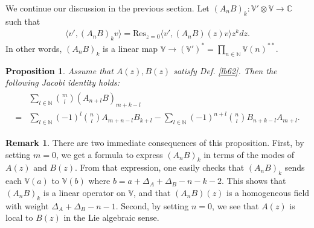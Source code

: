 \documentclass[11pt,b5paper,notitlepage]{article}
\theoremstyle{definition}
\newtheorem{rem}[df]{Remark}
\theoremstyle{plain}
\newtheorem{pp}[df]{Proposition}
\newcommand{\Res}{\mathrm{Res}}
\newcommand{\bk}[1]{\langle {#1}\rangle}
\newcommand{\Vbb}{\mathbb V}
\newcommand{\Cbb}{\mathbb C}
\newcommand{\Nbb}{\mathbb N}
\numberwithin{equation}{section}
\begin{document}
We continue our discussion in the previous section. Let $(A_nB)_k:\Vbb'\otimes\Vbb\rightarrow\Cbb$ such that
\begin{align*}
\bk{v',(A_nB)_kv}=\Res_{z=0}\bk{v',(A_nB)(z)v}z^kdz.	
\end{align*}
In other words, $(A_nB)_k$ is a linear map $\Vbb\rightarrow(\Vbb')^*=\prod_{n\in\Nbb}\Vbb(n)^{**}$.

\begin{pp}\label{lb71}
Assume that $A(z),B(z)$ satisfy Def. \ref{lb62}. Then the following Jacobi identity holds:
\begin{align}\label{eq107}
\begin{aligned}
&\sum_{l\in\Nbb}{m\choose l}(A_{n+l}B)_{m+k-l}\\
=&\sum_{l\in\Nbb}(-1)^l{n\choose l}A_{m+n-l}B_{k+l}-\sum_{l\in\Nbb}(-1)^{n+l}{n\choose l}B_{n+k-l} A_{m+l}.
\end{aligned}
\end{align}
\end{pp}

\begin{rem}
There are two immediate consequences of this proposition. First, by setting $m=0$, we get a formula to express $(A_nB)_k$ in terms of the modes of $A(z)$ and $B(z)$. From that expression, one easily checks that $(A_nB)_k$ sends each $\Vbb(a)$ to $\Vbb(b)$ where $b=a+\Delta_A+\Delta_B-n-k-2$. This shows that $(A_nB)_k$ is a linear operator on $\Vbb$, and that $(A_nB)(z)$ is a homogeneous field with weight $\Delta_A+\Delta_B-n-1$. Second, by setting $n=0$, we see that $A(z)$ is local to $B(z)$ in the Lie algebraic sense.
\end{rem}
\end{document}

